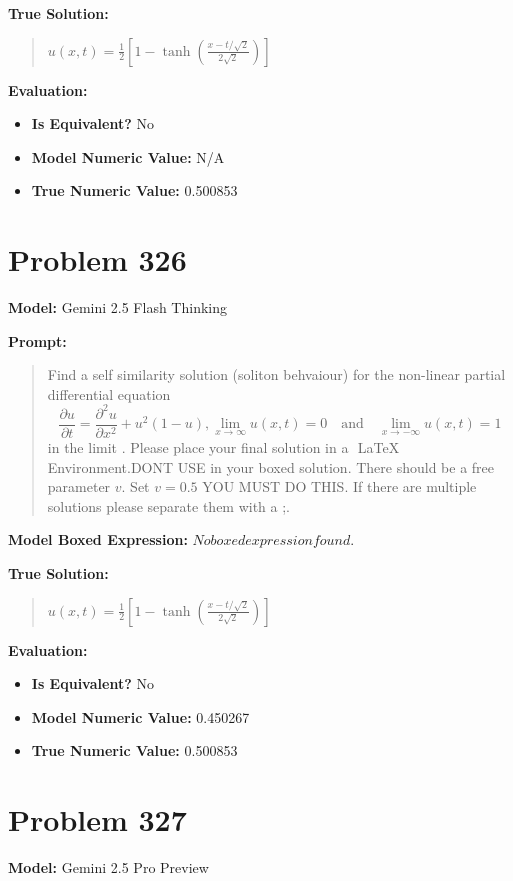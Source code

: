 \documentclass{article}
\begin{document}
{\textbf{True Solution:}
\begin{quote}
$u(x, t) = \frac{1}{2} \left[ 1 - \tanh\left( \frac{x - t/\sqrt{2}}{2\sqrt{2}} \right) \right]$
\end{quote}

\textbf{Evaluation:}
\begin{itemize}
\item \textbf{Is Equivalent?} No
\item \textbf{Model Numeric Value:} N/A
\item \textbf{True Numeric Value:} 0.500853
\end{itemize}
\vspace{1cm}
\section*{Problem 326}
\textbf{Model:} Gemini 2.5 Flash Thinking

\textbf{Prompt:}
\begin{quote}
Find a self similarity solution (soliton behvaiour) for the non-linear partial differential equation $$ \frac{\partial u}{\partial t} = \frac{\partial^2 u}{\partial x^2} + u^2 (1-u), \lim_{x \to \infty} u(x, t) = 0 \quad \text{and} \quad \lim_{x \to -\infty} u(x, t) = 1 $$ in the limit . Please place your final solution in a $\boxed{}$ LaTeX Environment.DONT USE \operatorname in your boxed solution. There should be a free parameter $v$. Set $v=0.5$ YOU MUST DO THIS. If there are multiple solutions please separate them with a ;.
\end{quote}
\textbf{Model Boxed Expression:} $No boxed expression found.$

\textbf{True Solution:}
\begin{quote}
$u(x, t) = \frac{1}{2} \left[ 1 - \tanh\left( \frac{x - t/\sqrt{2}}{2\sqrt{2}} \right) \right]$
\end{quote}

\textbf{Evaluation:}
\begin{itemize}
\item \textbf{Is Equivalent?} No
\item \textbf{Model Numeric Value:} 0.450267
\item \textbf{True Numeric Value:} 0.500853
\end{itemize}
\vspace{1cm}
\section*{Problem 327}
\textbf{Model:} Gemini 2.5 Pro Preview

}
\end{document}
